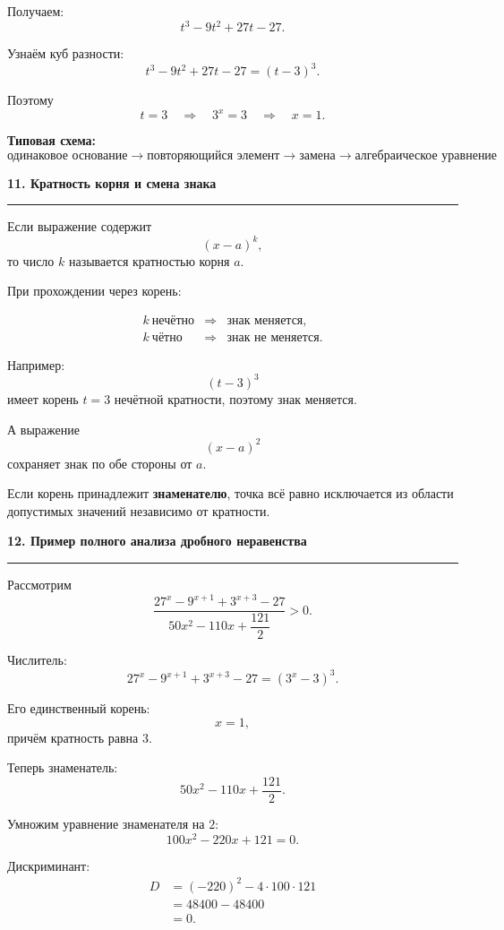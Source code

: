 \documentclass[a4paper,12pt]{article}
\newcommand{\checktitle}[1]{%
    \vspace{0.4em}
    {\Large\bfseries\textcolor{darkaccent}{#1}}\par
    \vspace{0.25em}
    {\color{accent!55}\rule{\linewidth}{0.6pt}}
    \vspace{0.45em}
}
\newcommand{\important}[1]{\textbf{\textcolor{darkaccent}{#1}}}
\begin{document}
Получаем:
\[
    t^3-9t^2+27t-27.
\]

Узнаём куб разности:
\[
    t^3-9t^2+27t-27=(t-3)^3.
\]

Поэтому
\[
    t=3
    \quad\Longrightarrow\quad
    3^x=3
    \quad\Longrightarrow\quad
    x=1.
\]

\important{Типовая схема:}
\[
\boxed{
\text{одинаковое основание}
\to
\text{повторяющийся элемент}
\to
\text{замена}
\to
\text{алгебраическое уравнение}
}
\]


\checktitle{11. Кратность корня и смена знака}

Если выражение содержит
\[
    (x-a)^k,
\]
то число \(k\) называется кратностью корня \(a\).

При прохождении через корень:

\[
\begin{array}{ccl}
k\ \text{нечётно}
&\Longrightarrow&
\text{знак меняется},\\[0.2cm]

k\ \text{чётно}
&\Longrightarrow&
\text{знак не меняется}.
\end{array}
\]

Например:
\[
    (t-3)^3
\]
имеет корень \(t=3\) нечётной кратности, поэтому знак меняется.

А выражение
\[
    (x-a)^2
\]
сохраняет знак по обе стороны от \(a\).

Если корень принадлежит \important{знаменателю}, точка всё равно исключается из области допустимых значений независимо от кратности.


\checktitle{12. Пример полного анализа дробного неравенства}

Рассмотрим
\[
    \frac{
        27^x-9^{x+1}+3^{x+3}-27
    }{
        50x^2-110x+\dfrac{121}{2}
    }>0.
\]

Числитель:
\[
    27^x-9^{x+1}+3^{x+3}-27
    =
    (3^x-3)^3.
\]

Его единственный корень:
\[
    x=1,
\]
причём кратность равна \(3\).

Теперь знаменатель:
\[
    50x^2-110x+\frac{121}{2}.
\]

Умножим уравнение знаменателя на \(2\):
\[
    100x^2-220x+121=0.
\]

Дискриминант:
\[
\begin{aligned}
    D
    &=
    (-220)^2-4\cdot100\cdot121\\
    &=
    48400-48400\\
    &=0.
\end{aligned}
\]
\end{document}
